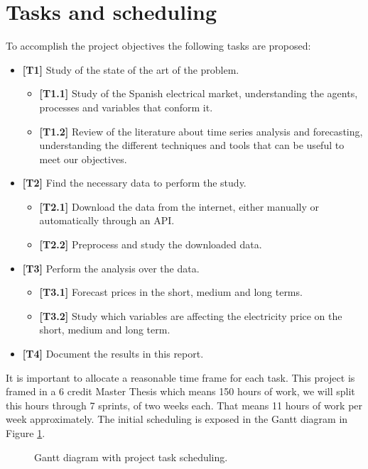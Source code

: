 \section{Tasks and scheduling}
To accomplish the project objectives the following tasks are proposed:
\begin{itemize}
    \item \textbf{[T1]} Study of the state of the art of the problem.
    \begin{itemize}
        \item \textbf{[T1.1]} Study of the Spanish electrical market, understanding the agents, processes and variables that conform it.
        \item \textbf{[T1.2]} Review of the literature about time series analysis and forecasting, understanding the different techniques and tools that can be useful to meet our objectives.
    \end{itemize}
    \item \textbf{[T2]} Find the necessary data to perform the study.
    \begin{itemize}
        \item \textbf{[T2.1]} Download the data from the internet, either manually or automatically through an API.
        \item \textbf{[T2.2]} Preprocess and study the downloaded data.
    \end{itemize}
    \item \textbf{[T3]} Perform the analysis over the data.
    \begin{itemize}
        \item \textbf{[T3.1]} Forecast prices in the short, medium and long terms.
        \item \textbf{[T3.2]} Study which variables are affecting the electricity price on the short, medium and long term.
    \end{itemize}
    \item \textbf{[T4]} Document the results in this report.
\end{itemize}

It is important to allocate a reasonable time frame for each task. This project is framed in a 6 credit Master Thesis which means 150 hours of work, we will split this hours through 7 sprints, of two weeks each. That means 11 hours of work per week approximately. The initial scheduling is exposed in the Gantt diagram in Figure \ref{fig:planning-gantt}.

\begin{figure}[H]
\centering
    \caption{Gantt diagram with project task scheduling.}
    \label{fig:planning-gantt}
\end{figure}